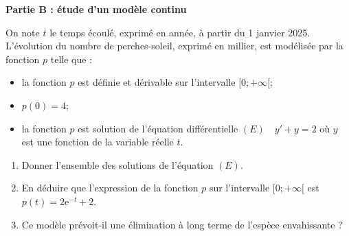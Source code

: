 \documentclass[10pt]{article}
\providecommand{\e}{{\mathrm{e}}}
\begin{document}
\textbf{Partie B : étude d'un modèle continu}

On note $t$ le temps écoulé, exprimé en année, à partir du 1 janvier 2025. L'évolution du nombre de perches-soleil, exprimé en millier, est modélisée par la fonction $p$ telle que :

\begin{itemize}
\item la fonction $p$ est définie et dérivable sur l'intervalle $[0;+\infty[$;
\item $p(0)=4$;
\item la fonction $p$ est solution de l'équation différentielle $(E) \quad y'+y=2$ \quad où $y$ est une fonction de la variable réelle $t$.
\end{itemize}

\begin{enumerate}
\item Donner l'ensemble des solutions de l'équation $(E)$.
\item En déduire que l'expression de la fonction $p$ sur l'intervalle $[0;+\infty[$ est \quad $p(t)=2 \e^{-t}+2$.
\item Ce modèle prévoit-il une élimination à long terme de l'espèce envahissante ?
\end{enumerate}
\end{document}
